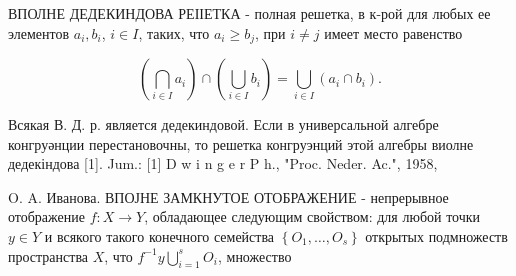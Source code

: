 \documentclass[10pt]{article}
\begin{document}
ВПОЛНЕ ДЕДЕКИНДОВА РЕІІЕТКА - полная решетка, в к-рой для любых ее элементов $a_{i}, b_{i}$, $i \in I$, таких, что $a_{i} \geqslant b_{j}$, при $i \neq j$ имеет место равенство



\[

\left(\bigcap_{i \in I} a_{i}\right) \cap\left(\bigcup_{i \in I} b_{i}\right)=\bigcup_{i \in I}\left(a_{i} \cap b_{i}\right) .

\]



Всякая В. Д. р. является дедекиндовой. Если в универсальной алгебре конгруәнции перестановочны, то решетка конгруэнций этой алгебры виолне дедекіндова [1]. Jum.: [1] D w i n g e r P h., "Proc. Neder. Ac.", 1958,

O. A. Иванова. ВПОЈНЕ ЗАМКНУТОЕ ОТОБРАЖЕНИЕ - непрерывное отображение $f: X \rightarrow Y$, обладающее следующим свойством: для любой точки $y \in Y$ и всякого такого конечного семейства $\left\{O_{1}, \ldots, O_{s}\right\}$ открытых подмножеств пространства $X$, что $f^{-1} y \bigcup_{i=1}^{s} O_{i}$, множество
\end{document}
